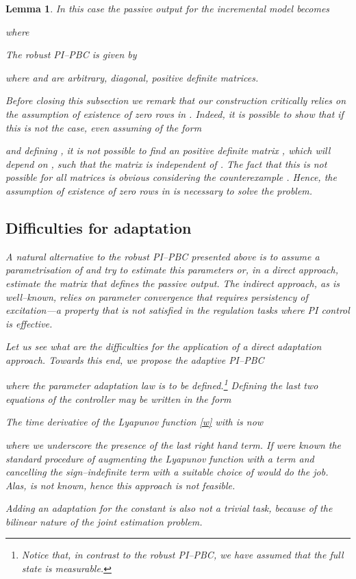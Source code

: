 \documentclass[10pt, conference]{ieeeconf}
\newtheorem{lemma}{Lemma}
\def\lab{\label}
\begin{document}
\begin{lemma}
In this case the passive output  for the incremental model becomes

where

The robust PI--PBC is given by

where  and  are arbitrary, diagonal, positive definite matrices.


Before closing this subsection we remark that our construction {\em critically} relies on the assumption of existence of  zero rows in . Indeed, it is possible to show that if this is not the case, even assuming  of the form

and defining , it is not possible to find an  positive definite matrix , which will depend on , such that the matrix  is {\em independent} of . The fact that this is {\em not possible} for all matrices  is obvious considering the counterexample . Hence, the assumption of existence of  zero rows in  is {\em necessary} to solve the problem. 
\subsection{Difficulties for adaptation}
\lab{subsec52}	
A natural alternative to the robust PI--PBC presented above is to assume a parametrisation of  and try to estimate this parameters or, in a direct approach, estimate the matrix  that defines the passive output. The indirect approach, as is well--known,  relies on parameter convergence that requires persistency of excitation---a property that is not satisfied in the regulation tasks where PI control is effective.

Let us see what are the difficulties for the application of a direct adaptation approach. Towards this end, we propose the adaptive PI--PBC

where the parameter adaptation law  is to be defined.\footnote{Notice that, in contrast to the robust PI--PBC, we have assumed that the full state is measurable.} Defining  the last two equations of the controller may be written in the form

The time derivative of the Lyapunov function \eqref{w} with  is now

where we underscore the presence of the last right hand term. If  were known the standard procedure of augmenting the Lyapunov function with a term  and cancelling the sign--indefinite term with a suitable choice of  would do the job. Alas,  is not known, hence this approach is not feasible. 

Adding an adaptation for the constant  is also not a trivial task, because of the bilinear nature of the joint estimation problem.

\end{lemma}
\end{document}
